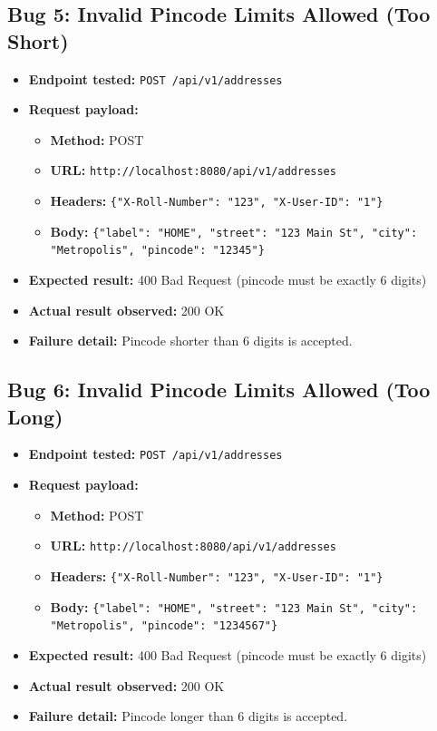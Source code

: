 ﻿\documentclass[11pt,a4paper]{article}
\begin{document}
\subsection*{Bug 5: Invalid Pincode Limits Allowed (Too Short)}
\begin{itemize}
  \item \textbf{Endpoint tested:} \texttt{POST /api/v1/addresses}
  \item \textbf{Request payload:}
  \begin{itemize}
    \item \textbf{Method:} POST
    \item \textbf{URL:} \texttt{http://localhost:8080/api/v1/addresses}
    \item \textbf{Headers:} \texttt{\{"X-Roll-Number": "123", "X-User-ID": "1"\}}
    \item \textbf{Body:} \texttt{\{"label": "HOME", "street": "123 Main St", "city": "Metropolis", "pincode": "12345"\}}
  \end{itemize}
  \item \textbf{Expected result:} 400 Bad Request (pincode must be exactly 6 digits)
  \item \textbf{Actual result observed:} 200 OK
  \item \textbf{Failure detail:} Pincode shorter than 6 digits is accepted.
\end{itemize}

\subsection*{Bug 6: Invalid Pincode Limits Allowed (Too Long)}
\begin{itemize}
  \item \textbf{Endpoint tested:} \texttt{POST /api/v1/addresses}
  \item \textbf{Request payload:}
  \begin{itemize}
    \item \textbf{Method:} POST
    \item \textbf{URL:} \texttt{http://localhost:8080/api/v1/addresses}
    \item \textbf{Headers:} \texttt{\{"X-Roll-Number": "123", "X-User-ID": "1"\}}
    \item \textbf{Body:} \texttt{\{"label": "HOME", "street": "123 Main St", "city": "Metropolis", "pincode": "1234567"\}}
  \end{itemize}
  \item \textbf{Expected result:} 400 Bad Request (pincode must be exactly 6 digits)
  \item \textbf{Actual result observed:} 200 OK
  \item \textbf{Failure detail:} Pincode longer than 6 digits is accepted.
\end{itemize}
\end{document}
